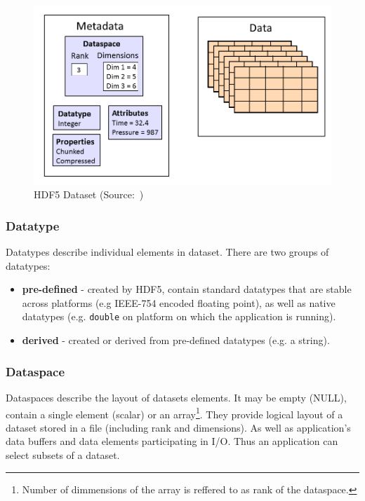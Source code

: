 \documentclass[thesis=M,english]{FITthesis}[2019/12/23]
\begin{document}
\begin{figure}[H]
    \centering
    \includegraphics[scale=0.3]{static/dataset.png}
    \caption{HDF5 Dataset (Source:~\cite{hdf5})}
\end{figure}

\subsubsection{Datatype}

Datatypes describe individual elements in dataset. There are two groups of datatypes:
\begin{itemize}
    \item \textbf{pre-defined} - created by HDF5, contain standard datatypes that are stable across platforms
          (e.g IEEE-754 encoded floating point), as well as native datatypes (e.g. \texttt{double} on platform
          on which the application is running).
    \item \textbf{derived} - created or derived from pre-defined datatypes (e.g. a string).
\end{itemize}

\subsubsection{Dataspace}

Dataspaces describe the layout of datasets elements. It may be empty (NULL), contain a single element (scalar)
or an array\footnote{Number of dimmensions of the array is reffered to as rank of the dataspace.}. They provide
logical layout of a dataset stored in a file (including rank and dimensions). As well as application's data buffers
and data elements participating in I/O. Thus an application can select subsets of a dataset.
\end{document}
